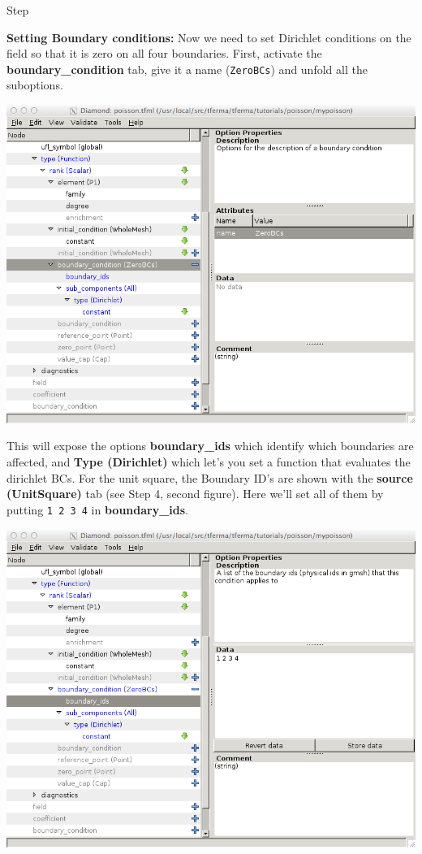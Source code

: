 \begin{steps}{Step}
\begin{center}
\end{center}
\item \textbf{Setting Boundary conditions:} Now we need to set
  Dirichlet conditions on the field so that it is zero on all four
  boundaries. First, activate the \textbf{boundary\_condition} tab,
  give it a name (\texttt{ZeroBCs}) and
  unfold all the suboptions. 
\begin{center}
    \includegraphics[width=\diamondwidth]{figures/screendumps/diamond_poisson_08b.png}
\end{center}
This will expose the options \textbf{boundary\_ids} which identify
which boundaries are affected, and \textbf{Type (Dirichlet)} which
let's you set a function that evaluates the dirichlet BCs.  For the
unit square,  the Boundary ID's are shown with the \textbf{source
  (UnitSquare)} tab (see Step 4, second figure).  Here we'll set all
of them by putting \texttt{1 2 3 4} in \textbf{boundary\_ids}.  
\begin{center}
    \includegraphics[width=\diamondwidth]{figures/screendumps/diamond_poisson_08c.png}

\end{center}
\end{steps}

